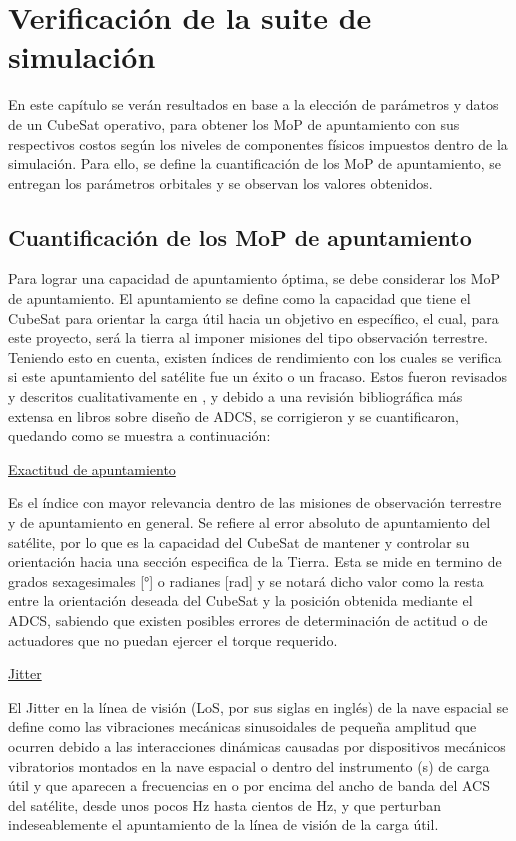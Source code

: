 \section{Verificación de la suite de simulación}

En este capítulo se verán resultados en base a la elección de parámetros y datos de un CubeSat operativo, para obtener los MoP de apuntamiento con sus respectivos costos según los niveles de componentes físicos impuestos dentro de la simulación. Para ello, se define la cuantificación de los MoP de apuntamiento, se entregan los parámetros orbitales y se observan los valores obtenidos.

\subsection{Cuantificación de los MoP de apuntamiento}

Para lograr una capacidad de apuntamiento óptima, se debe considerar los MoP de apuntamiento. El apuntamiento se define como la capacidad que tiene el CubeSat para orientar la carga útil hacia un objetivo en específico, el cual, para este proyecto, será la tierra al imponer misiones del tipo observación terrestre. Teniendo esto en cuenta, existen índices de rendimiento con los cuales se verifica si este apuntamiento del satélite fue un éxito o un fracaso. Estos fueron revisados y descritos cualitativamente en \cite{ref6}, y debido a una revisión bibliográfica más extensa en libros sobre diseño de \gls{ADCS}, se corrigieron y se cuantificaron, quedando como se muestra a continuación:

\underline{Exactitud de apuntamiento \cite{ref5,ref7}}

Es el índice con mayor relevancia dentro de las misiones de observación terrestre y de apuntamiento en general. Se refiere al error absoluto de apuntamiento del satélite, por lo que es la capacidad del CubeSat de mantener y controlar su orientación hacia una sección especifica de la Tierra. Esta se mide en termino de grados sexagesimales [°] o radianes [rad] y se notará dicho valor como la resta entre la orientación deseada del CubeSat y la posición obtenida mediante el \gls{ADCS}, sabiendo que existen posibles errores de determinación de actitud o de actuadores que no puedan ejercer el torque requerido.

\underline{Jitter \cite{ref5,ref9,ref10}}

El Jitter en la línea de visión (LoS, por sus siglas en inglés) de la nave espacial se define como las vibraciones mecánicas sinusoidales de pequeña amplitud que ocurren debido a las interacciones dinámicas causadas por dispositivos mecánicos vibratorios montados en la nave espacial o dentro del instrumento (s) de carga útil y que aparecen a frecuencias en o por encima del ancho de banda del \gls{ACS} del satélite, desde unos pocos Hz hasta cientos de Hz, y que perturban indeseablemente el apuntamiento de la línea de visión de la carga útil. 

